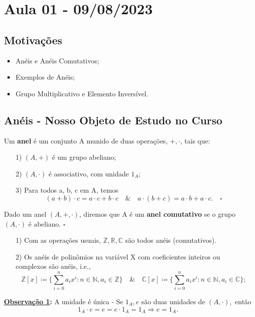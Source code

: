 \documentclass[algebraII_notes.tex]{subfiles}
\begin{document}
\section{Aula 01 - 09/08/2023}
\subsection{Motivações}
\begin{itemize}
	\item Anéis e Anéis Comutativos;
	\item Exemplos de Anéis;
	\item Grupo Multiplicativo e Elemento Inversível.
\end{itemize}
\subsection{Anéis - Nosso Objeto de Estudo no Curso}
\begin{def*}
	Um \textbf{anel} é um conjunto A munido de duas operações, \(+, \cdot \), tais que:
	\begin{itemize}
		\item[1)] \((A, +)\) é um grupo abeliano;
		\item[2)] \((A, \cdot )\) é associativo, com unidade \(1_{A}\);
		\item[3)] Para todos a, b, c em A, temos
		      \[
			      (a+b)\cdot c = a \cdot c + b \cdot c \quad\&\quad a \cdot (b+c) = a \cdot b + a \cdot c.\quad\square
		      \]
	\end{itemize}
\end{def*}
\begin{def*}
	Dado um anel \((A, +, \cdot )\), diremos que A é um \textbf{anel comutativo} se o grupo \((A, \cdot )\) é abeliano. \(\square\)
\end{def*}
\begin{example}
	\begin{itemize}
		\item[1)] Com as operações usuais, \(\mathbb{Z}, \mathbb{R}, \mathbb{C}\) são todos anéis (comutativos).
		\item[2)] Os anéis de polinômios na variável X com coeficientes inteiros ou complexos são anéis, i.e.,
		      \[
			      \mathbb{Z}[x]\coloneqq \biggl\{\sum\limits_{i=0}^{n}a_{i}x^{i}: n\in \mathbb{N}, a_{i}\in \mathbb{Z}\biggr\}\quad\&\quad \mathbb{C}[x]\coloneqq \biggl\{\sum\limits_{i=0}^{n}a_{i}x^{i}:n\in \mathbb{N}, a_{i}\in \mathbb{C}\biggr\};
		      \]

	\end{itemize}
\end{example}
\textbf{\underline{Observação 1}:} A unidade é única - Se \(1_{A}, e\) são duas unidades de \((A, \cdot ),\) então
\[
	1_{A}\cdot e = e = e \cdot 1_{A} = 1_{A} \Rightarrow e = 1_{A}.
\]
\end{document}
